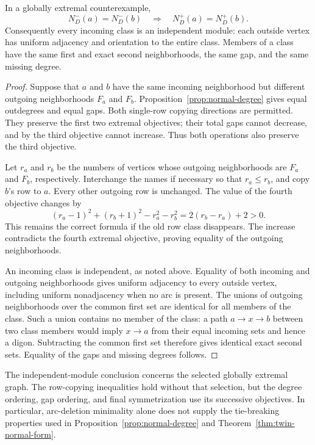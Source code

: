 \begin{theorem}
\label{thm:twin-normal-form}
In a globally extremal counterexample,
\[
 N_D^-(a)=N_D^-(b)\quad\Longrightarrow\quad N_D^+(a)=N_D^+(b).
\]
Consequently every incoming class is an independent module: each outside
vertex has uniform adjacency and orientation to the entire class.
Members of a class have the same first and exact second neighborhoods,
the same gap, and the same missing degree.
\end{theorem}
\begin{proof}
Suppose that $a$ and $b$ have the same incoming neighborhood but
different outgoing neighborhoods $F_a$ and $F_b$.
Proposition~\ref{prop:normal-degree} gives equal outdegrees and equal
gaps. Both single-row copying directions are permitted. They preserve
the first two extremal objectives; their total gaps cannot decrease,
and by the third objective cannot increase. Thus both operations also
preserve the third objective.

Let $r_a$ and $r_b$ be the numbers of vertices whose outgoing
neighborhoods are $F_a$ and $F_b$, respectively. Interchange the names
if necessary so that $r_a\leq r_b$, and copy $b$'s row to $a$.
Every other outgoing row is unchanged. The value of the fourth
objective changes by
\[
 (r_a-1)^2+(r_b+1)^2-r_a^2-r_b^2
       =2(r_b-r_a)+2>0.
\]
This remains the correct formula if the old row class disappears.
The increase contradicts the fourth extremal objective, proving
equality of the outgoing neighborhoods.

An incoming class is independent, as noted above. Equality of both
incoming and outgoing neighborhoods gives uniform adjacency to every
outside vertex, including uniform nonadjacency when no arc is present.
The unions of outgoing neighborhoods over the common first set are
identical for all members of the class. Such a union contains no
member of the class: a path $a\to x\to b$ between two class members
would imply $x\to a$ from their equal incoming sets and hence a
digon. Subtracting the common first set therefore gives identical
exact second sets. Equality of the gaps and missing degrees follows.
\end{proof}

The independent-module conclusion concerns the selected globally
extremal graph. The row-copying inequalities hold without that selection,
but the degree ordering, gap ordering, and final symmetrization use its
successive objectives. In particular, arc-deletion minimality alone
does not supply the tie-breaking properties used in
Proposition~\ref{prop:normal-degree} and
Theorem~\ref{thm:twin-normal-form}.

